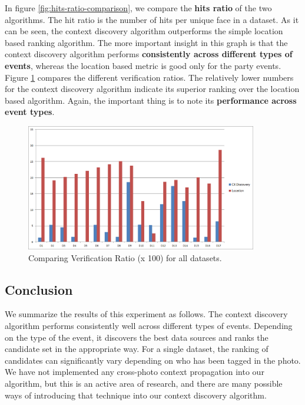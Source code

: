 In figure \ref{fig:hits-ratio-comparison}, we compare the \textbf{hits ratio} of the two algorithms. The hit ratio is the number of hits per unique face in a dataset. As it can be seen, the context discovery algorithm outperforms the simple location based ranking algorithm. The more important insight in this graph is that the context discovery algorithm performs \textbf{consistently across different types of events}, whereas the location based metric is good only for the party events. Figure \ref{fig:verification-ratio-comparison} compares the different verification ratios. The relatively lower numbers for the context discovery algorithm indicate its superior ranking over the location based algorithm. Again, the important thing is to note its \textbf{performance across event types}. 

\begin{figure}[t]
\centering
\includegraphics[width=0.9\textwidth]{media/chapter5/verification-ratio-comparison-all-datasets.png}
\caption{Comparing Verification Ratio (x 100) for all datasets.}
\label{fig:verification-ratio-comparison}
\end{figure}

\subsection{Conclusion}
We summarize the results of this experiment as follows. The context discovery algorithm performs consistently well across different types of events. Depending on the type of the event, it discovers the best data sources and ranks the candidate set in the appropriate way. For a single dataset, the ranking of candidates can significantly vary depending on who has been tagged in the photo. We have not implemented any cross-photo context propagation into our algorithm, but this is an active area of research, and there are many possible ways of introducing that technique into our context discovery algorithm.

